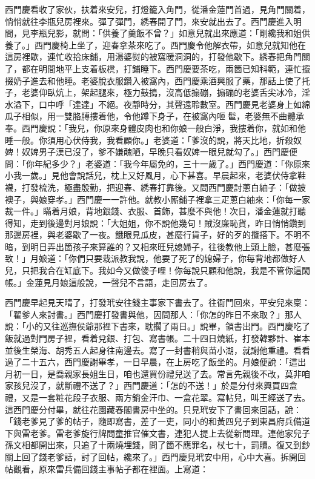 西門慶看收了家伙，扶着來安兒，打燈籠入角門，從潘金蓮門首過，見角門關着，悄悄就往李瓶兒房裡來。彈了彈門，{}綉春開了門，來安就出去了。西門慶進入明間，見李瓶兒影，就問：「供養了羹飯不曾？」如意兒就出來應道：「剛纔我和姐供養了。」西門慶椅上坐了，迎春拿茶來吃了。西門慶令他解衣帶，如意兒就知他在這房裡歇，連忙收拾床鋪，用湯婆熨的被窩暖洞洞的，打發他歇下。綉春把角門關了，都在明間地平上支着板櫈，打鋪睡下。西門慶要茶吃，兩箇已知科範，連忙攛掇奶子進去和他睡。老婆脫衣服鑽入被窩內，西門慶乘酒興服了藥，那話上使了托子，老婆仰臥炕上，架起腿來，極力鼓搗，沒高低搧磞，搧磞的老婆舌尖冰冷，淫水溢下，口中呼「達達」不絕。夜靜時分，其聲遠聆數室。{}西門慶見老婆身上如綿瓜子相似，用一雙胳膊摟着他，令他蹲下身子，在被窩內咂𩫻䯲，老婆無不曲體承奉。西門慶說：「我兒，你原來身體皮肉也和你娘一般白淨，我摟着你，就如和他睡一般。{}你須用心伏侍我，我看顧你。」老婆道：「爹沒的說，將天比地，折殺奴婢！奴婢男子漢已沒了，爹不嫌醜陋，早晚只看奴婢一眼兒就勾了。」西門慶便問：「你年紀多少？」老婆道：「我今年屬免的，三十一歲了。」西門慶道：「你原來小我一歲。」見他會說話兒，枕上又好風月，心下甚喜。早晨起來，老婆伏侍拿鞋襪，打發梳洗，極盡殷勤，把迎春、綉春打靠後。又問西門慶討蔥白紬子：「做披襖子，與娘穿孝。」西門慶一一許他。就教小厮鋪子裡拿三疋蔥白紬來：「你每一家裁一件。」瞞着月娘，背地銀錢、衣服、首飾，甚麼不與他！次日，潘金蓮就打聽得知，走到後邊對月娘說：「大姐姐，你不說他幾句！賊沒廉恥貨，昨日悄悄鑽到那邊房裡，與老婆歇了一夜。餓眼見瓜皮，甚麼行貨子，好的歹的攬搭下。不明不暗，到明日弄出箇孩子來算誰的？又相來旺兒媳婦子，往後教他上頭上臉，甚麼張致！」月娘道：「你們只要栽派教我說，他要了死了的媳婦子，你每背地都做好人兒，只把我合在缸底下。我如今又做傻子哩！你每說只顧和他說，我是不管你這閑帳。」金蓮見月娘這般說，一聲兒不言語，走回房去了。

西門慶早起見天晴了，打發玳安往錢主事家下書去了。往衙門回來，平安兒來稟：「翟爹人來討書。」西門慶打發書與他，因問那人：「你怎的昨日不來取？」那人說：「小的又往巡撫侯爺那裡下書來，{}耽擱了兩日。」說畢，領書出門。西門慶吃了飯就過對門房子裡，看着兌銀、打包、寫書帳。二十四日燒紙，打發韓夥計、崔本並後生榮海、胡秀五人起身往南邊去。寫了一封書稍與苗小湖，就謝他重禮。看看過了二十五六，西門慶謝畢孝，一日早晨，在上房吃了飯坐的。月娘便說：「這出月初一日，是喬親家長姐生日，咱也還買份禮兒送了去。常言先親後不改，莫非咱家孩兒沒了，就斷禮不送了？」西門慶道：「怎的不送！」於是分付來興買四盒禮，又是一套粧花段子衣服、兩方銷金汗巾、一盒花翠。寫帖兒，叫王經送了去。這西門慶分付畢，就往花園藏春閣書房中坐的。只見玳安下了書回來回話，說：「錢老爹見了爹的帖子，隨即寫書，差了一吏，同小的和黃四兒子到東昌府兵備道下與雷老爹。雷老爹旋行牌問童推官催文書，連犯人提上去從新問理。連他家兒子孫文相都開出來，只追了十兩燒埋錢，問了箇不應罪名，杖七十，罰贖。復又到鈔關上回了錢老爹話，討了回帖，纔來了。」西門慶見玳安中用，心中大喜。拆開回帖觀看，原來雷兵備回錢主事帖子都在裡面。上寫道：

